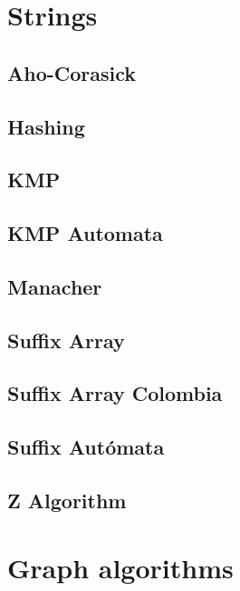 \section{Strings}
\subsection{Aho-Corasick}
\raggedbottom
\hrulefill
\subsection{	Hashing}
\raggedbottom
\hrulefill
\subsection{	KMP}
\raggedbottom
\hrulefill
\subsection{KMP Automata}
\raggedbottom
\hrulefill
\subsection{Manacher}
\raggedbottom
\hrulefill
\subsection{Suffix Array}
\raggedbottom
\hrulefill
\subsection{Suffix Array Colombia}
\raggedbottom
\hrulefill
\subsection{Suffix Autómata}
\raggedbottom
\hrulefill
\subsection{   Z Algorithm}
\raggedbottom
\hrulefill

\section{Graph algorithms}
